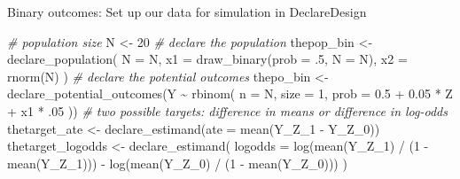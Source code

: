 \documentclass[
  ignorenonframetext,
]{beamer}
\newenvironment{Shaded}{\begin{snugshade}}{\end{snugshade}}
\newcommand{\AttributeTok}[1]{\textcolor[rgb]{0.77,0.63,0.00}{#1}}
\newcommand{\CommentTok}[1]{\textcolor[rgb]{0.56,0.35,0.01}{\textit{#1}}}
\newcommand{\DecValTok}[1]{\textcolor[rgb]{0.00,0.00,0.81}{#1}}
\newcommand{\FloatTok}[1]{\textcolor[rgb]{0.00,0.00,0.81}{#1}}
\newcommand{\FunctionTok}[1]{\textcolor[rgb]{0.00,0.00,0.00}{#1}}
\newcommand{\NormalTok}[1]{#1}
\newcommand{\OtherTok}[1]{\textcolor[rgb]{0.56,0.35,0.01}{#1}}
\newcommand{\SpecialCharTok}[1]{\textcolor[rgb]{0.00,0.00,0.00}{#1}}
\begin{document}
\begin{frame}[fragile]{Binary outcomes: Set up our data for simulation
in DeclareDesign}
\protect\hypertarget{binary-outcomes-set-up-our-data-for-simulation-in-declaredesign}{}
\scriptsize

\begin{Shaded}
\begin{Highlighting}[]
\CommentTok{\# population size}
\NormalTok{N }\OtherTok{\textless{}{-}} \DecValTok{20}
\CommentTok{\# declare the population}
\NormalTok{thepop\_bin }\OtherTok{\textless{}{-}} \FunctionTok{declare\_population}\NormalTok{(}
  \AttributeTok{N =}\NormalTok{ N, }\AttributeTok{x1 =} \FunctionTok{draw\_binary}\NormalTok{(}\AttributeTok{prob =}\NormalTok{ .}\DecValTok{5}\NormalTok{, }\AttributeTok{N =}\NormalTok{ N),}
  \AttributeTok{x2 =} \FunctionTok{rnorm}\NormalTok{(N)}
\NormalTok{)}
\CommentTok{\# declare the potential outcomes}
\NormalTok{thepo\_bin }\OtherTok{\textless{}{-}} \FunctionTok{declare\_potential\_outcomes}\NormalTok{(Y }\SpecialCharTok{\textasciitilde{}} \FunctionTok{rbinom}\NormalTok{(}
  \AttributeTok{n =}\NormalTok{ N, }\AttributeTok{size =} \DecValTok{1}\NormalTok{,}
  \AttributeTok{prob =} \FloatTok{0.5} \SpecialCharTok{+} \FloatTok{0.05} \SpecialCharTok{*}\NormalTok{ Z }\SpecialCharTok{+}\NormalTok{ x1 }\SpecialCharTok{*}\NormalTok{ .}\DecValTok{05}
\NormalTok{))}
\CommentTok{\# two possible targets: difference in means or difference in log{-}odds}
\NormalTok{thetarget\_ate }\OtherTok{\textless{}{-}} \FunctionTok{declare\_estimand}\NormalTok{(}\AttributeTok{ate =} \FunctionTok{mean}\NormalTok{(Y\_Z\_1 }\SpecialCharTok{{-}}\NormalTok{ Y\_Z\_0))}
\NormalTok{thetarget\_logodds }\OtherTok{\textless{}{-}} \FunctionTok{declare\_estimand}\NormalTok{(}
  \AttributeTok{logodds =} \FunctionTok{log}\NormalTok{(}\FunctionTok{mean}\NormalTok{(Y\_Z\_1) }\SpecialCharTok{/}\NormalTok{ (}\DecValTok{1} \SpecialCharTok{{-}} \FunctionTok{mean}\NormalTok{(Y\_Z\_1))) }\SpecialCharTok{{-}}
    \FunctionTok{log}\NormalTok{(}\FunctionTok{mean}\NormalTok{(Y\_Z\_0) }\SpecialCharTok{/}\NormalTok{ (}\DecValTok{1} \SpecialCharTok{{-}} \FunctionTok{mean}\NormalTok{(Y\_Z\_0)))}
\NormalTok{)}
\end{Highlighting}
\end{Shaded}

\normalsize
\end{frame}
\end{document}
